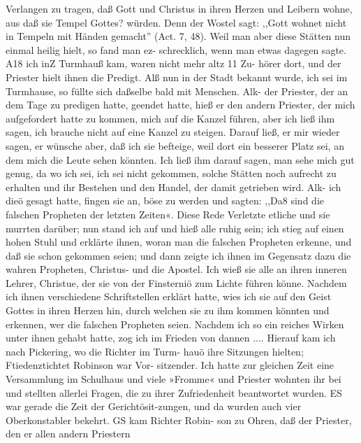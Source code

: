 
Verlangen zu tragen, daß Gott und Christus in ihren Herzen
und Leibern wohne, aus daß sie Tempel Gottes? würden. Denn
der Wostel sagt: ,,Gott wohnet nicht in Tempeln mit Händen
gemacht'' (Act. 7, 48). Weil man aber diese Stätten nun einmal
heilig hielt, so fand man ez- schrecklich, wenn man etwas dagegen
sagte. A18 ich inZ Turmhauß kam, waren nicht mehr altz 11 Zu-
hörer dort, und der Priester hielt ihnen die Predigt. Alß nun
in der Stadt bekannt wurde, ich sei im Turmhause, so füllte sich
daßselbe bald mit Menschen. Alk- der Priester, der an dem Tage
zu predigen hatte, geendet hatte, hieß er den andern Priester, der
mich aufgefordert hatte zu kommen, mich auf die Kanzel führen,
aber ich ließ ihm sagen, ich brauche nicht auf eine Kanzel zu
steigen. Darauf ließ, er mir wieder sagen, er wünsche aber, daß
ich sie befteige, weil dort ein besserer Platz sei, an dem mich die
Leute sehen könnten. Ich ließ ihm darauf sagen, man sehe mich
gut genug, da wo ich sei, ich sei nicht gekommen, solche Stätten
noch aufrecht zu erhalten und ihr Bestehen und den Handel, der
damit getrieben wird. Alk- ich dieö gesagt hatte, fingen sie an,
böse zu werden und sagten: ,,Da8 sind die falschen Propheten
der letzten Zeiten«. Diese Rede Verletzte etliche und sie murrten
darüber; nun stand ich auf und hieß alle ruhig sein; ich stieg
auf einen hohen Stuhl und erklärte ihnen, woran man die falschen
Propheten erkenne, und daß sie schon gekommen seien; und dann
zeigte ich ihnen im Gegensatz dazu die wahren Propheten, Christus-
und die Apostel. Ich wieß sie alle an ihren inneren Lehrer,
Christue, der sie von der Finsterniö zum Lichte führen könne.
Nachdem ich ihnen verschiedene Schriftstellen erklärt hatte, wies
ich sie auf den Geist Gottes in ihren Herzen hin, durch welchen
sie zu ihm kommen könnten und erkennen, wer die falschen
Propheten seien. Nachdem ich so ein reiches Wirken unter ihnen
gehabt hatte, zog ich im Frieden von dannen ....
Hierauf kam ich nach Pickering, wo die Richter im Turm-
hauö ihre Sitzungen hielten; Ftiedenztichtet Robinson war Vor-
sitzender. Ich hatte zur gleichen Zeit eine Versammlung im
Schulhaus und viele »Fromme« und Priester wohnten ihr bei
und stellten allerlei Fragen, die zu ihrer Zufriedenheit beantwortet
wurden. ES war gerade die Zeit der Gerichtösit-zungen, und da
wurden auch vier Oberkonstabler bekehrt. GS kam Richter Robin-
son zu Ohren, daß der Priester, den er allen andern Priestern


